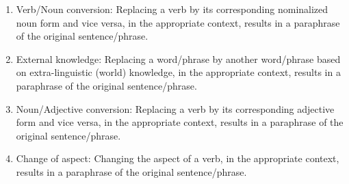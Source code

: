 \begin{enumerate}
    \item Verb/Noun conversion: Replacing a verb by its corresponding nominalized noun form and vice versa, in the appropriate context, results in a paraphrase of the original sentence/phrase.
    \item External knowledge: Replacing a word/phrase by another word/phrase based on extra-linguistic (world) knowledge, in the appropriate context, results in a paraphrase of the original sentence/phrase.
    \item Noun/Adjective conversion: Replacing a verb by its corresponding adjective form and vice versa, in the appropriate context, results in a paraphrase of the original sentence/phrase.
    
    \item Change of aspect: Changing the aspect of a verb, in the appropriate context, results in a paraphrase of the original sentence/phrase.
    
\end{enumerate}


